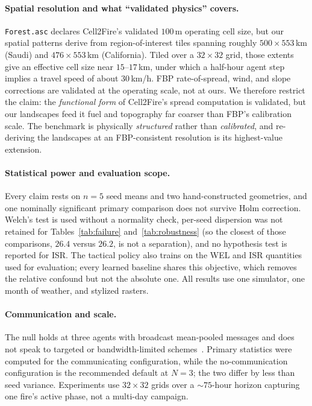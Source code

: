 \documentclass[letterpaper]{article}
\begin{document}
\paragraph{Spatial resolution and what ``validated physics'' covers.} \texttt{Forest.asc} declares Cell2Fire's validated $100$\,m operating cell size, but our spatial patterns derive from region-of-interest tiles spanning roughly $500\times553$\,km (Saudi) and $476\times553$\,km (California). Tiled over a $32\times32$ grid, those extents give an effective cell size near $15$--$17$\,km, under which a half-hour agent step implies a travel speed of about $30$\,km/h. FBP rate-of-spread, wind, and slope corrections are validated at the operating scale, not at ours. We therefore restrict the claim: the \emph{functional form} of Cell2Fire's spread computation is validated, but our landscapes feed it fuel and topography far coarser than FBP's calibration scale. The benchmark is physically \emph{structured} rather than \emph{calibrated}, and re-deriving the landscapes at an FBP-consistent resolution is its highest-value extension.

\paragraph{Statistical power and evaluation scope.} Every claim rests on $n=5$ seed means and two hand-constructed geometries, and one nominally significant primary comparison does not survive Holm correction. Welch's test is used without a normality check, per-seed dispersion was not retained for Tables~\ref{tab:failure} and~\ref{tab:robustness} (so the closest of those comparisons, $26.4$ versus $26.2$, is not a separation), and no hypothesis test is reported for ISR. The tactical policy also trains on the WEL and ISR quantities used for evaluation; every learned baseline shares this objective, which removes the relative confound but not the absolute one. All results use one simulator, one month of weather, and stylized rasters.

\paragraph{Communication and scale.} The null holds at three agents with broadcast mean-pooled messages and does not speak to targeted or bandwidth-limited schemes~\citep{das2019tarmac, zhu2024commsurvey}. Primary statistics were computed for the communicating configuration, while the no-communication configuration is the recommended default at $N=3$; the two differ by less than seed variance. Experiments use $32\times32$ grids over a $\sim75$-hour horizon capturing one fire's active phase, not a multi-day campaign.
\end{document}
